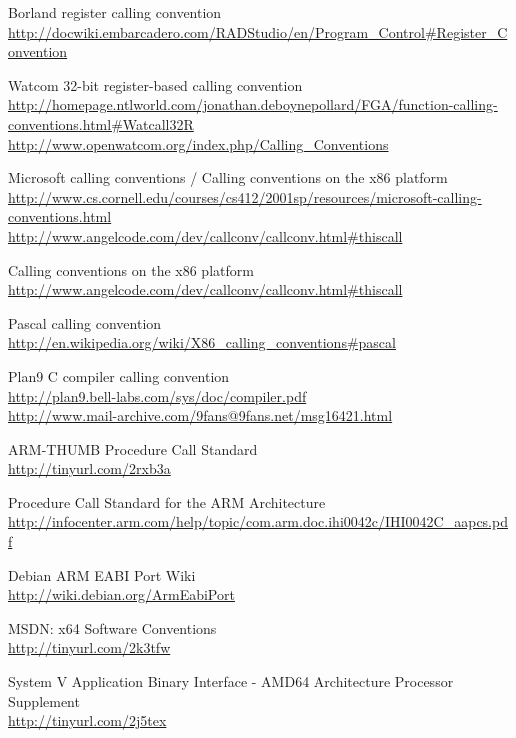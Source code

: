 \begin{thebibliography}{14}
	Borland register calling convention\\
	\url{http://docwiki.embarcadero.com/RADStudio/en/Program\_Control#Register\_Convention}

	Watcom 32-bit register-based calling convention\\
	\url{http://homepage.ntlworld.com/jonathan.deboynepollard/FGA/function-calling-conventions.html#Watcall32R}
	\url{http://www.openwatcom.org/index.php/Calling\_Conventions}

	Microsoft calling conventions / Calling conventions on the x86 platform\\
	\url{http://www.cs.cornell.edu/courses/cs412/2001sp/resources/microsoft-calling-conventions.html}\\
	\url{http://www.angelcode.com/dev/callconv/callconv.html#thiscall}

	Calling conventions on the x86 platform\\
	\url{http://www.angelcode.com/dev/callconv/callconv.html#thiscall}

	Pascal calling convention\\
	\url{http://en.wikipedia.org/wiki/X86\_calling\_conventions#pascal}%

	Plan9 C compiler calling convention\\
	\url{http://plan9.bell-labs.com/sys/doc/compiler.pdf}\\
	\url{http://www.mail-archive.com/9fans@9fans.net/msg16421.html}

	ARM-THUMB Procedure Call Standard\\
	\url{http://tinyurl.com/2rxb3a}

        Procedure Call Standard for the ARM Architecture\\
        \url{http://infocenter.arm.com/help/topic/com.arm.doc.ihi0042c/IHI0042C\_aapcs.pdf}

	Debian ARM EABI Port Wiki\\
	\url{http://wiki.debian.org/ArmEabiPort}

	MSDN: x64 Software Conventions\\
	\url{http://tinyurl.com/2k3tfw}

	System V Application Binary Interface - AMD64 Architecture Processor Supplement\\
	\url{http://tinyurl.com/2j5tex}


\end{thebibliography}
